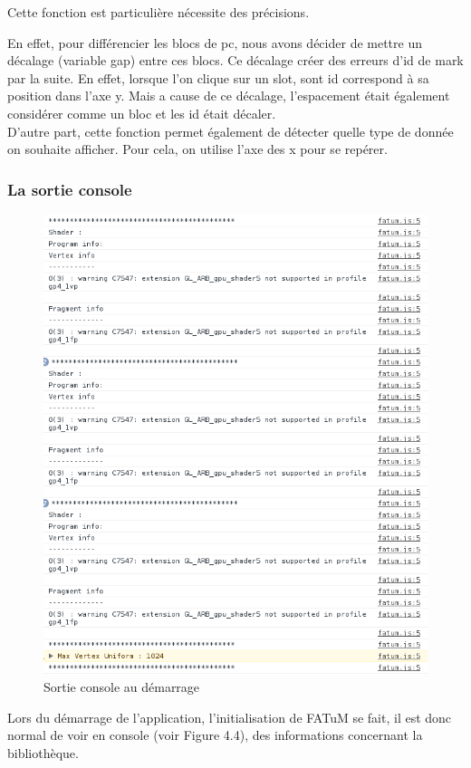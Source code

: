Cette fonction est particulière nécessite des précisions. 

En effet, pour différencier les blocs de pc, nous avons décider de mettre un décalage (variable gap) entre ces blocs. Ce décalage créer des erreurs d'id de mark par la suite. En effet, lorsque l'on clique sur un slot, sont id correspond à sa position dans l'axe y. Mais a cause de ce décalage, l'espacement était également considérer comme un bloc et les id était décaler.\\

D'autre part, cette fonction permet également de détecter quelle type de donnée on souhaite afficher. Pour cela, on utilise l'axe des x pour se repérer.

\subsubsection{La sortie console}

\begin{figure}[H]
  \centering
    \includegraphics[scale=0.5]{images/console_fatum.png}
        \caption{Sortie console au démarrage}
\end{figure}
Lors du démarrage de l'application, l'initialisation de FATuM se fait, il est donc normal de voir en console (voir Figure 4.4), des informations concernant la bibliothèque.

